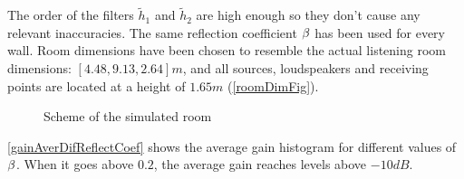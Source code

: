 The order of the filters $\widetilde{h}_1$ and $\widetilde{h}_2$ are high enough so they don't cause any relevant inaccuracies. The same reflection coefficient $\beta$ has been used for every wall. Room dimensions have been chosen to resemble the actual listening room dimensions: $[4.48, 9.13, 2.64]\si{m}$, and all sources, loudspeakers and receiving points are located at a height of $1.65\si{m}$ (\autoref{roomDimFig}).

\begin{figure}
	\centering
\caption{Scheme of the simulated room}
\label{roomDimFig}
\end{figure}

\autoref{gainAverDifReflectCoef} shows the average gain histogram for different values of $\beta$. When it goes above $0.2$, the average gain reaches levels above $-10 \si{dB}$.

